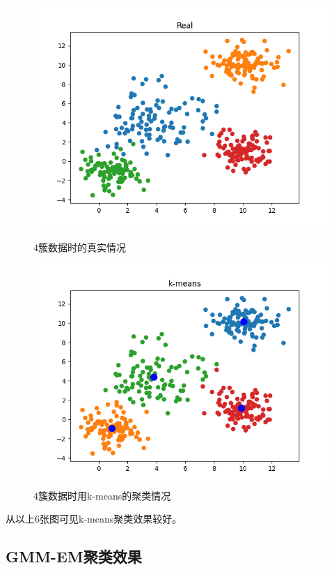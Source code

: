 \begin{figure}[htbp]
    \begin{minipage}[t]{0.5\linewidth}
        \centering
        \includegraphics[width=\textwidth]{figures/Figure_5.png}
        \caption{$4$簇数据时的真实情况}
    \end{minipage}
    \begin{minipage}[t]{0.5\linewidth}
        \centering
        \includegraphics[width=\textwidth]{figures/Figure_6.png}
        \caption{$4$簇数据时用k-means的聚类情况}
    \end{minipage}
\end{figure}
从以上6张图可见k-means聚类效果较好。

\subsection{GMM-EM聚类效果}

